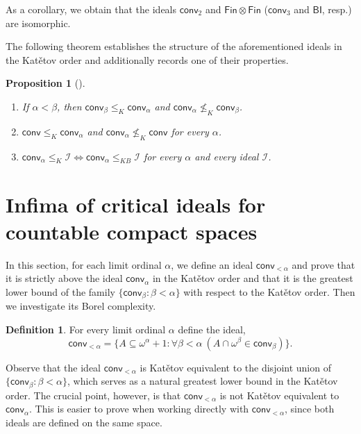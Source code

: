 \documentclass{amsart}
\theoremstyle{plain}
\newtheorem{proposition}[theorem]{Proposition}
\theoremstyle{definition}
\newtheorem{definition}[theorem]{Definition}
\theoremstyle{remark}
\newcommand{\cI}{\mathcal{I}}
\newcommand{\I}{\cI}
\newcommand{\FIN}{\mathsf{Fin}}
\newcommand{\fin}{\FIN}
\newcommand{\conv}{\mathsf{conv}}
\newcommand{\BI}{\mathsf{BI}}
\renewcommand{\subset}{\subseteq}
\begin{document}
As a corollary, we obtain that the ideals $\conv_2$ and $\fin\otimes \fin$ ($\conv_3$ and $\BI$, resp.) are isomorphic. 





The following theorem establishes the structure of the aforementioned ideals in the Kat\v{e}tov order and additionally records one of their properties.

\begin{proposition}[\cite{critical-ideals-RF-MK-AK}] \ 
\label{prop:hasldkfhas}
\begin{enumerate}
    \item If $\alpha<\beta$, then $\conv_\beta\leq_K\conv_\alpha$  and $\conv_\alpha\not\leq_K\conv_\beta$.     
    \item  $\conv \leq_K \conv_{\alpha}$ and  $\conv_\alpha\not\leq_K\conv$ for every  $\alpha$.
    \item $\conv_\alpha\leq_K \I \iff \conv_\alpha \leq_{KB} \I$ for every $\alpha $ and every ideal $\I$.
\end{enumerate}
 
\end{proposition}








\section{Infima of critical ideals for countable compact spaces}
In this section, for each limit ordinal $\alpha$, we define an ideal  $\conv_{<\alpha}$ and prove that it is strictly above the ideal $\conv_\alpha$ in the Kat\v{e}tov order and that it is the greatest lower bound of the family $\{\conv_\beta : \beta <\alpha\}$ with respect to the Kat\v{e}tov order. Then we investigate its Borel complexity.


\begin{definition}
For every limit ordinal $\alpha $ define the ideal, 
    $$\conv_{<\alpha} =\{A\subset \omega^{\alpha}+1 : \forall\beta<\alpha \ (A\cap \omega^\beta \in\conv_\beta) \}. $$
\end{definition}


Observe that the ideal $\conv_{<\alpha}$ is Kat\v{e}tov equivalent to the disjoint union of $\{\conv_\beta : \beta <\alpha\}$, which serves as a natural greatest lower bound in the Kat\v{e}tov order. The crucial point, however, is that $\conv_{<\alpha}$ is not Kat\v{e}tov equivalent to $\conv_\alpha$. This is easier to prove when working directly with $\conv_{<\alpha}$, since both ideals are defined on the same space.
\end{document}
